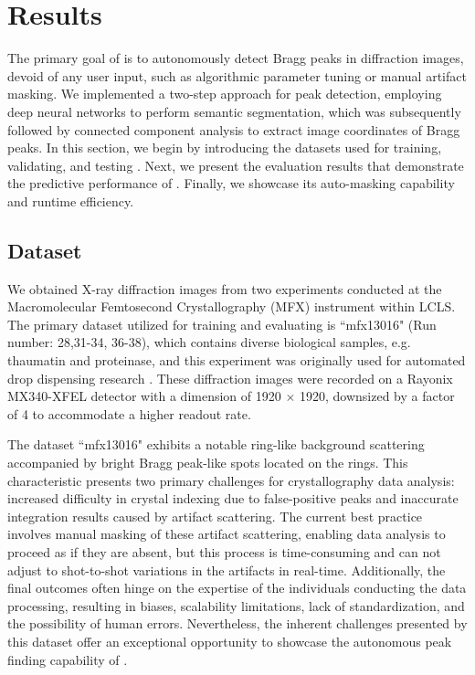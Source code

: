 \documentclass[a4paper]{article}
\begin{document}
\section{Results}

The primary goal of \peaknet{} is to autonomously detect Bragg peaks in diffraction images, devoid of any user input, such as algorithmic parameter tuning or manual artifact masking.  We implemented a two-step approach for peak detection, employing deep neural networks to perform semantic segmentation, which was subsequently followed by connected component analysis to extract image coordinates of Bragg peaks.  In this section, we begin by introducing the datasets used for training, validating, and testing \peaknet{}. Next, we present the evaluation results that demonstrate the predictive performance of \peaknet{}. Finally, we showcase its auto-masking capability and runtime efficiency.


\subsection{Dataset}

We obtained X-ray diffraction images from two experiments conducted at the Macromolecular Femtosecond Crystallography (MFX) instrument within LCLS.  The primary dataset utilized for training and evaluating \peaknet{} is ``mfx13016" (Run number: 28,31-34, 36-38), which contains diverse biological samples, e.g.  thaumatin and proteinase, and this experiment was originally used for automated drop dispensing research \citep{suSerialCrystallographyUsing2021}.  These diffraction images were recorded on a Rayonix MX340-XFEL detector with a dimension of 1920 $\times$ 1920, downsized by a factor of 4 to accommodate a higher readout rate.  

The dataset ``mfx13016" exhibits a notable ring-like background scattering accompanied by bright Bragg peak-like spots located on the rings.  This characteristic presents two primary challenges for crystallography data analysis: increased difficulty in crystal indexing due to false-positive peaks and inaccurate integration results caused by artifact scattering.  The current best practice involves manual masking of these artifact scattering, enabling data analysis to proceed as if they are absent, but this process is time-consuming and can not adjust to shot-to-shot variations in the artifacts in real-time.  Additionally, the final outcomes often hinge on the expertise of the individuals conducting the data processing, resulting in biases, scalability limitations, lack of standardization, and the possibility of human errors.  Nevertheless, the inherent challenges presented by this dataset offer an exceptional opportunity to showcase the autonomous peak finding capability of \peaknet{}.
\end{document}
